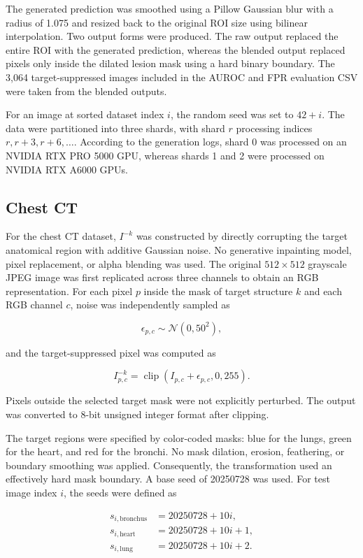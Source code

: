 The generated prediction was smoothed using a Pillow Gaussian blur with a radius of 1.075 and resized back to the original ROI size using bilinear interpolation. Two output forms were produced. The raw output replaced the entire ROI with the generated prediction, whereas the blended output replaced pixels only inside the dilated lesion mask using a hard binary boundary. The 3,064 target-suppressed images included in the AUROC and FPR evaluation CSV were taken from the blended outputs.

For an image at sorted dataset index $i$, the random seed was set to $42+i$. The data were partitioned into three shards, with shard $r$ processing indices $r, r+3, r+6, \ldots$. According to the generation logs, shard 0 was processed on an NVIDIA RTX PRO 5000 GPU, whereas shards 1 and 2 were processed on NVIDIA RTX A6000 GPUs.

\subsection{Chest CT}

For the chest CT dataset, $I^{-k}$ was constructed by directly corrupting the target anatomical region with additive Gaussian noise. No generative inpainting model, pixel replacement, or alpha blending was used. The original $512 \times 512$ grayscale JPEG image was first replicated across three channels to obtain an RGB representation. For each pixel $p$ inside the mask of target structure $k$ and each RGB channel $c$, noise was independently sampled as

\[
\epsilon_{p,c} \sim \mathcal{N}\!\left(0,50^2\right),
\]

and the target-suppressed pixel was computed as

\[
I^{-k}_{p,c}
=
\operatorname{clip}\!\left(
I_{p,c}+\epsilon_{p,c},
0,255
\right).
\]

Pixels outside the selected target mask were not explicitly perturbed. The output was converted to 8-bit unsigned integer format after clipping.

The target regions were specified by color-coded masks: blue for the lungs, green for the heart, and red for the bronchi. No mask dilation, erosion, feathering, or boundary smoothing was applied. Consequently, the transformation used an effectively hard mask boundary. A base seed of 20250728 was used. For test image index $i$, the seeds were defined as

\[
\begin{aligned}
s_{i,\mathrm{bronchus}} &= 20250728 + 10i,\\
s_{i,\mathrm{heart}} &= 20250728 + 10i + 1,\\
s_{i,\mathrm{lung}} &= 20250728 + 10i + 2.
\end{aligned}
\]

